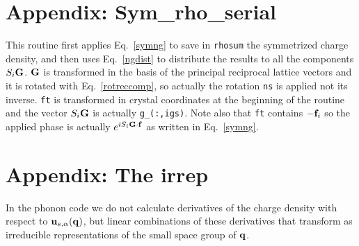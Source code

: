 \documentclass[12pt,a4paper,twoside]{report}
\begin{document}
\section{Appendix: Sym\_rho\_serial}

This routine first applies Eq.~\ref{symng} to save in \texttt{rhosum} the symmetrized charge density, and then uses Eq.~\ref{ngdist} to distribute the results to all the components
$S_i {\bf G}$. ${\bf G}$ is transformed in the basis of the principal reciprocal lattice 
vectors and it is rotated with Eq.~\ref{rotreccomp}, so actually the rotation
\texttt{ns} is applied not its inverse. \texttt{ft} is transformed in crystal coordinates at the beginning of the routine and the vector $S_i {\bf G}$ is actually \texttt{g\_(:,igs)}. Note also that \texttt{ft} contains $-{\bf f}_i$ so the
applied phase is actually $e^{iS_i{\bf G}\cdot {\bf f}}$ as written in Eq.~\ref{symng}.

\section{Appendix: The irrep}
In the phonon code we do not calculate derivatives of the charge density with respect to 
${\bf u}_{s,\alpha}({\bf q})$, but linear combinations of these derivatives that transform as irreducible representations of the small space group of ${\bf q}$. 
\end{document}
